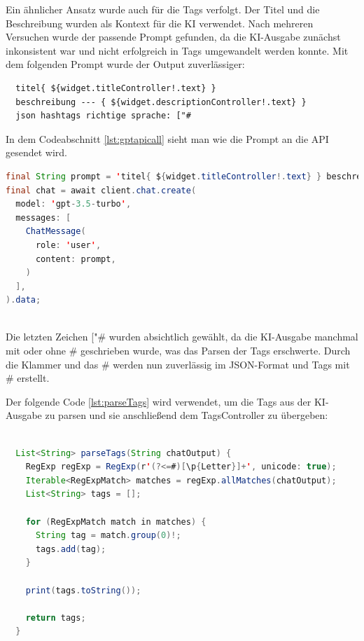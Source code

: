 Ein ähnlicher Ansatz wurde auch für die Tags verfolgt. Der Titel und die Beschreibung wurden als Kontext für die KI verwendet. Nach mehreren Versuchen wurde der passende Prompt gefunden, da die KI-Ausgabe zunächst inkonsistent war und nicht erfolgreich in Tags umgewandelt werden konnte. Mit dem folgenden Prompt wurde der Output zuverlässiger:

\begin{verbatim}
  titel{ ${widget.titleController!.text} }
  beschreibung --- { ${widget.descriptionController!.text} }
  json hashtags richtige sprache: ["#
  \end{verbatim}


In dem Codeabschnitt \ref{lst:gptapicall} sieht man wie die Prompt an die API gesendet wird.
\begin{lstlisting}[language=Java,caption=OpenAI GPT-3.5-turbo API Call,label=lst:gptapicall]  
final String prompt = 'titel{ ${widget.titleController!.text} } beschreibung{ ${widget.descriptionController!.text} } json hashtags richtige sprache: ["#';
final chat = await client.chat.create(
  model: 'gpt-3.5-turbo',
  messages: [
    ChatMessage(
      role: 'user',
      content: prompt,
    )
  ],
).data;
      
\end{lstlisting}



Die letzten Zeichen ["\# wurden absichtlich gewählt, da die
KI-Ausgabe manchmal mit oder ohne \# geschrieben wurde, was
das Parsen der Tags erschwerte. Durch die Klammer und das \#
werden nun zuverlässig im JSON-Format und Tags mit \#
erstellt.

Der folgende Code \ref{lst:parseTags} wird verwendet, um die Tags aus der KI-Ausgabe zu parsen und sie anschließend dem TagsController zu übergeben:

\begin{lstlisting}[language=Java,caption=parseTags von 
  KI output,label=lst:parseTags]  
  
  List<String> parseTags(String chatOutput) {
    RegExp regExp = RegExp(r'(?<=#)[\p{Letter}]+', unicode: true);
    Iterable<RegExpMatch> matches = regExp.allMatches(chatOutput);
    List<String> tags = [];

    for (RegExpMatch match in matches) {
      String tag = match.group(0)!;
      tags.add(tag);
    }

    print(tags.toString());

    return tags;
  }
    
\end{lstlisting}


